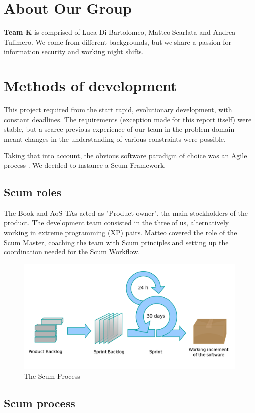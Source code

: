 \documentclass[a4paper,twoside,openright]{report}
\begin{document}
\newpage
\section{About Our Group}
\textbf{Team K} is comprised of Luca Di Bartolomeo, Matteo Scarlata and Andrea Tulimero. We come from different backgrounds, but we share a passion for information security and working night shifts.

\section{Methods of development}
This project required from the start rapid, evolutionary development, with constant deadlines. The requirements (exception made for this report itself) were stable, but a scarce previous experience of our team in the problem domain meant changes in the understanding of various constraints were possible.

Taking that into account, the obvious software paradigm of choice was an Agile process \cite{agile}. 
We decided to instance a Scum Framework.

\subsection{Scum roles}
The Book and AoS TAs acted as "Product owner", the main stockholders of the product.
The development team consisted in the three of us, alternatively working in extreme programming (XP) pairs.
Matteo covered the role of the Scum Master, coaching the team with Scum principles and setting up the coordination needed for the Scum Workflow.

\begin{figure}
	\centering
	\includegraphics[width=0.7\linewidth]{assets/scrum}

	\caption[The Scum Process]{The Scum Process \cite{scum}}
	\label{fig:scrum}
\end{figure}

\subsection{Scum process}
\end{document}
